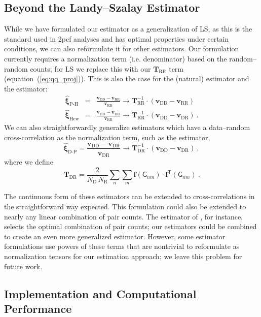 \documentclass[modern]{aastex62}
\newcommand{\cf}{2pcf\xspace}
\newcommand{\LS}{LS\xspace}
\newcommand{\eqt}[1]{equation~(\ref{#1})}
\newcommand{\inv}{^{-1}}
\newcommand{\T}{^{\mathsf{T}}}
\newcommand{\bld}[1]{\bm{#1}}
\newcommand{\vv}[1]{\bld{v}_\mathrm{#1}}
\newcommand{\TT}[1]{\bld{T}_\mathrm{#1}}
\newcommand{\ff}{\bld{f}}
\newcommand{\NN}[1]{N_\mathrm{#1}}
\newcommand{\GG}[1]{\mathsf{G}_{#1}}
\begin{document}
\subsection{Beyond the Landy--Szalay Estimator}
\label{sec:beyondls}

While we have formulated our estimator as a generalization of \LS, as this is the standard used in \cf analyses and has optimal properties under certain conditions, we can also reformulate it for other estimators.
Our formulation currently requires a normalization term (i.e. denominator) based on the random--random counts; for \LS we replace this with our $\TT{RR}$ term (\eqt{eq:qq_proj}).
This is also the case for the \cite{PeeblesHauser1974} (natural) estimator and the \cite{Hewett1982} estimator:
\begin{eqnarray}
    \bld{\hat{\xi}}_\text{P-H} &=& \frac{\vv{DD} - \vv{RR}}{\vv{RR}} \rightarrow \TT{RR}\inv \cdot \left( \vv{DD} - \vv{RR} \right)\\
    \bld{\hat{\xi}}_\text{Hew} &=& \frac{\vv{DD} - \vv{DR}}{\vv{RR}} \rightarrow \TT{RR}\inv \cdot \left( \vv{DD} - \vv{DR} \right) ~.
\end{eqnarray}
We can also straightforwardly generalize estimators which have a data--random cross-correlation as the normalization term, such as the \cite{DavisPeebles1983} estimator,
\begin{equation}
    \bld{\hat{\xi}}_\text{D-P} = \frac{\vv{DD} - \vv{DR}}{\vv{DR}} \rightarrow \TT{DR}\inv \cdot \left( \vv{DD} - \vv{DR} \right) ~,
\end{equation}
where we define
\begin{equation}
    \TT{DR} = \frac{2}{\NN{D}\,\NN{R}} \sum_{n} \sum_{m} \ff(\GG{n m}) \cdot \ff\T(\GG{n m}) ~.
\end{equation}

The continuous form of these estimators can be extended to cross-correlations in the straightforward way expected.
This formulation could also be extended to nearly any linear combination of pair counts.
The estimator of \cite{VargasMagana2013}, for instance, selects the optimal combination of pair counts; our estimators could be combined to create an even more generalized estimator.
However, some estimator formulations use powers of these terms that are nontrivial to reformulate as normalization tensors for our estimation approach; we leave this problem for future work.

\subsection{Implementation and Computational Performance}
\label{sec:comp}
\end{document}
